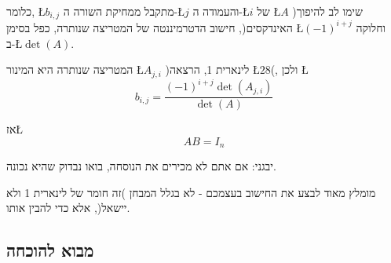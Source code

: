 \documentclass[english,hebrew]{article}
\begin{document}
כלומר, \L{$b_{i,j}$} מתקבל ממחיקת השורה ה-\L{$j$} והעמודה ה-\L{$i$}
של \L{$A$} )שימו לב להיפוך האינדקסים(, חישוב הדטרמיננטה של המטריצה
שנותרה, כפל בסימן \L{$\left(-1\right)^{i+j}$} וחלוקה ב-\L{$\det(A)$}.

המטריצה שנותרה היא המינור \L{$A_{j,i}$} )לינארית 1, הרצאה \L{$28$}(,
ולכן \L{%
\[
b_{i,j}=\frac{\left(-1\right)^{i+j}\det\left(A_{j,i}\right)}{\det(A)}
\]
}%

אז\L{%
\[
AB=I_{n}
\]
}%
 

יבגני: אם אתם לא מכירים את הנוסחה, בואו נבדוק שהיא נכונה. 

מומלץ מאוד לבצע את החישוב בעצמכם - לא בגלל המבחן )זה חומר של לינארית
1 ולא יישאל(, אלא כדי להבין אותו.

\subsection{מבוא להוכחה}
\end{document}
